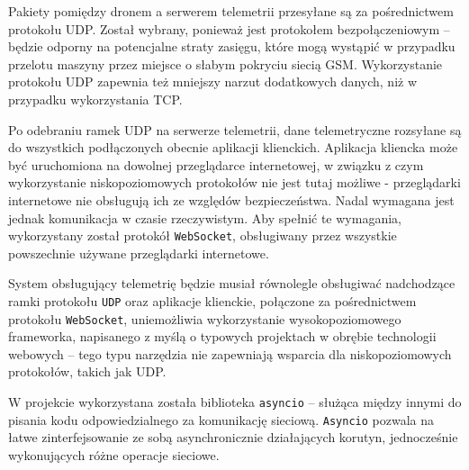 Pakiety pomiędzy dronem a serwerem telemetrii przesyłane są za pośrednictwem protokołu
UDP. Został wybrany, ponieważ jest protokołem bezpołączeniowym -- będzie odporny na
potencjalne straty zasięgu, które mogą wystąpić w przypadku
przelotu maszyny przez miejsce o słabym pokryciu siecią GSM. Wykorzystanie protokołu
UDP zapewnia też mniejszy narzut dodatkowych danych, niż w przypadku wykorzystania
TCP.

Po odebraniu ramek UDP na serwerze telemetrii, dane telemetryczne rozsyłane są do
wszystkich podłączonych obecnie aplikacji klienckich. Aplikacja kliencka może
być uruchomiona na dowolnej przeglądarce internetowej, w związku z czym wykorzystanie
niskopoziomowych protokołów nie jest tutaj możliwe - przeglądarki internetowe nie 
obsługują ich ze względów bezpieczeństwa. Nadal wymagana jest jednak komunikacja
w czasie rzeczywistym. 
Aby spełnić te wymagania, wykorzystany został protokół \texttt{WebSocket}\cite{websocket},
obsługiwany przez wszystkie powszechnie używane przeglądarki internetowe.

System obsługujący telemetrię będzie musiał równolegle obsługiwać nadchodzące
ramki protokołu \texttt{UDP} oraz aplikacje klienckie, połączone za pośrednictwem protokołu 
\texttt{WebSocket}, uniemożliwia wykorzystanie wysokopoziomowego frameworka,
napisanego z myślą o typowych projektach w obrębie technologii webowych --
tego typu narzędzia nie zapewniają wsparcia dla niskopoziomowych protokołów,
takich jak UDP.

W projekcie wykorzystana została biblioteka \texttt{asyncio} -- służąca między innymi
do pisania kodu odpowiedzialnego za komunikację sieciową\cite{asyncio}.
\texttt{Asyncio} pozwala na łatwe zinterfejsowanie ze sobą asynchronicznie działających
korutyn, jednocześnie wykonujących różne operacje sieciowe. 

